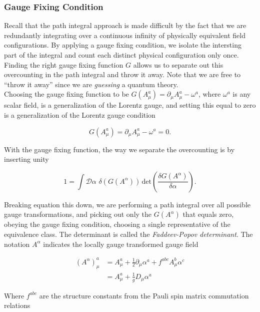 \subsubsection*{Gauge Fixing Condition}

\noindent Recall that the path integral approach is made difficult by the fact that we are redundantly integrating over a continuous infinity of physically equivalent field configurations. By applying a gauge fixing condition, we isolate the intersting part of the integral and count each distinct physical configuration only once. Finding the right gauge fixing function $G$ allows us to separate out this overcounting in the path integral and throw it away. Note that we are free to ``throw it away'' since we are \textit{guessing} a quantum theory.\\

\noindent Choosing the gauge fixing function to be $G(A_\mu^a) = \partial_\mu A_\mu^a - \omega^a$, where $\omega^a$ is any scalar field, is a generalization of the Lorentz gauge, and setting this equal to zero is a generalization of the Lorentz gauge condition

\begin{equation}
G(A_\mu^a) = \partial_\mu A_\mu^a - \omega^a = 0.
\end{equation}

\noindent With the gauge fixing function, the way we separate the overcounting is by inserting unity

\begin{equation}
1 = \int \mathcal{D} \alpha \,\, \delta(G(A^\alpha)) \, \text{det} \left( \frac{\delta G(A^\alpha)}{\delta \alpha} \right).
\end{equation}

\noindent Breaking equation this down, we are performing a path integral over all possible gauge transformations, and picking out only the $G(A^\alpha)$ that equals zero, obeying the gauge fixing condition, choosing a single representative of the equivalence class. The determinant is called the \textit{Faddeev-Popov determinant}. The notation $A^\alpha$ indicates the locally gauge transformed gauge field

\begin{align}
(A^\alpha)^a_\mu &= A^a_\mu + \frac{1}{2} \partial_\mu \alpha^a + f^{abc} A_\mu^b \alpha^c \\
&= A_\mu^a + \frac{1}{g} D_\mu \alpha^a
\end{align}

\noindent Where $f^{abc}$ are the structure constants from the Pauli spin matrix commutation relations

